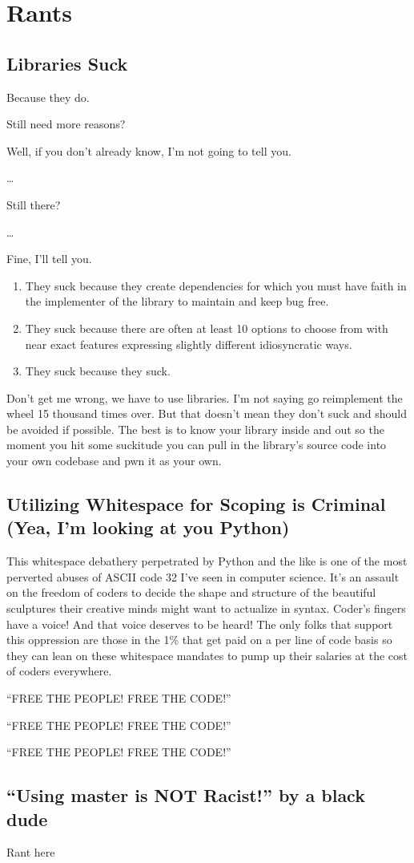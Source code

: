 \chapter{Rants}

\section{Libraries Suck}
\label{rant:librariessuck}
\par
Because they do.
\par
Still need more reasons?
\par
Well, if you don't already know, I'm not going to tell you.
\par
\dots
\par
Still there?
\par
\dots
\par
Fine, I'll tell you.
\begin{enumerate}
    \item They suck because they create dependencies for which you must have faith in the implementer of the library to maintain and keep bug free.
    \item They suck because there are often at least 10 options to choose from with near exact features expressing slightly different idiosyncratic ways.
    \item They suck because they suck.
\end{enumerate}
Don't get me wrong, we have to use libraries. I'm not saying go reimplement the wheel 15 thousand times over. But that doesn't mean they don't suck and should be avoided if possible. The best is to know your library inside and out so the moment you hit some suckitude you can pull in the library's source code into your own codebase and \gls{pwn} it as your own.

\section{Utilizing Whitespace for Scoping is Criminal (Yea, I'm looking at you Python)}
\label{rant:whitespacesucks}
\par
This whitespace debathery perpetrated by Python and the like is one of the most perverted abuses of ASCII code 32 I've seen in computer science. It's an assault on the freedom of coders to decide the shape and structure of the beautiful sculptures their creative minds might want to actualize in syntax. Coder's fingers have a voice! And that voice deserves to be heard! The only folks that support this oppression are those in the 1\% that get paid on a per line of code basis so they can lean on these whitespace mandates to pump up their salaries at the cost of coders everywhere.
\par
``FREE THE PEOPLE! FREE THE CODE!''
\par
``FREE THE PEOPLE! FREE THE CODE!''
\par
``FREE THE PEOPLE! FREE THE CODE!''

\section{``Using master is NOT Racist!'' by a black dude}
\label{rant:racistmaster}
\par
Rant here